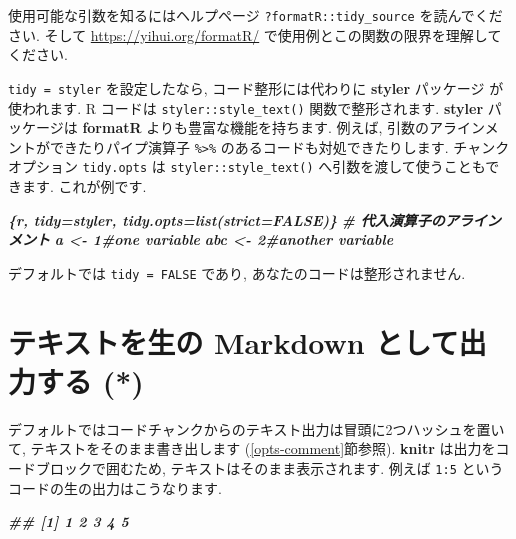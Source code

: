 \documentclass[
  11pt,
  lualatex,ja=standard,jafont=noto]{bxjsreport}
\newenvironment{Shaded}{\begin{snugshade}}{\end{snugshade}}
\newcommand{\InformationTok}[1]{\textcolor[rgb]{0.56,0.35,0.01}{\textbf{\textit{#1}}}}
\begin{document}
使用可能な引数を知るにはヘルプページ \texttt{?formatR::tidy\_source} を読んでください. そして \url{https://yihui.org/formatR/} で使用例とこの関数の限界を理解してください.

\texttt{tidy = styler} を設定したなら, コード整形には代わりに \textbf{styler} パッケージ \autocite{R-styler} が使われます. R コードは \texttt{styler::style\_text()} 関数で整形されます. \textbf{styler} パッケージは \textbf{formatR} よりも豊富な機能を持ちます. 例えば, 引数のアラインメントができたりパイプ演算子 \texttt{\%\textgreater{}\%} のあるコードも対処できたりします. チャンクオプション \texttt{tidy.opts} は \texttt{styler::style\_text()} へ引数を渡して使うこともできます. これが例です.

\begin{Shaded}
\begin{Highlighting}[]
\InformationTok{\textasciigrave{}\textasciigrave{}\textasciigrave{}\{r, tidy=\textquotesingle{}styler\textquotesingle{}, tidy.opts=list(strict=FALSE)\}}
\InformationTok{\# 代入演算子のアラインメント}
\InformationTok{a   \textless{}{-} 1\#one variable}
\InformationTok{abc \textless{}{-} 2\#another variable}
\InformationTok{\textasciigrave{}\textasciigrave{}\textasciigrave{}}
\end{Highlighting}
\end{Shaded}

デフォルトでは \texttt{tidy = FALSE} であり, あなたのコードは整形されません.

\hypertarget{results-asis}{%
\section{テキストを生の Markdown として出力する (*)}\label{results-asis}}

デフォルトではコードチャンクからのテキスト出力は冒頭に2つハッシュを置いて, テキストをそのまま書き出します (\ref{opts-comment}節参照). \textbf{knitr} は出力をコードブロックで囲むため, テキストはそのまま表示されます. 例えば \texttt{1:5} というコードの生の出力はこうなります.

\begin{Shaded}
\begin{Highlighting}[]
\InformationTok{\textasciigrave{}\textasciigrave{}\textasciigrave{}}
\InformationTok{\#\# [1] 1 2 3 4 5}
\InformationTok{\textasciigrave{}\textasciigrave{}\textasciigrave{}}
\end{Highlighting}
\end{Shaded}
\end{document}
